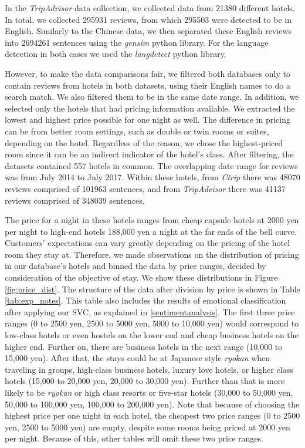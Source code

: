 \documentclass[smallextended,natbib]{svjour3}       %
\begin{document}
    In the \textit{TripAdvisor} data collection, we collected data from \num[group-separator={,}]{21380} different hotels. In total, we collected \num[group-separator={,}]{295931} reviews, from which \num[group-separator={,}]{295503} were detected to be in English. Similarly to the Chinese data, we then separated these English reviews into \num[group-separator={,}]{2694261} sentences using the \textit{gensim} python library. For the language detection in both cases we used the \textit{langdetect} python library.

    However, to make the data comparisons fair, we filtered both databases only to contain reviews from hotels in both datasets, using their English names to do a search match. We also filtered them to be in the same date range. In addition, we selected only the hotels that had pricing information available. We extracted the lowest and highest price possible for one night as well. The difference in pricing can be from better room settings, such as double or twin rooms or suites, depending on the hotel. Regardless of the reason, we chose the highest-priced room since it can be an indirect indicator of the hotel's class. After filtering, the datasets contained \num[group-separator={,}]{557} hotels in common. The overlapping date range for reviews was from July 2014 to July 2017. Within these hotels, from \textit{Ctrip} there was \num[group-separator={,}]{48070} reviews comprised of \num[group-separator={,}]{101963} sentences, and from \textit{TripAdvisor} there was \num[group-separator={,}]{41137} reviews comprised of \num[group-separator={,}]{348039} sentences. 

    The price for a night in these hotels ranges from cheap capsule hotels at 2000 yen per night to high-end hotels 188,000 yen a night at the far ends of the bell curve. Customers' expectations can vary greatly depending on the pricing of the hotel room they stay at. Therefore, we made observations on the distribution of pricing in our database's hotels and binned the data by price ranges, decided by consideration of the objective of stay. We show these distributions in Figure \ref{fig:price_dist}. The structure of the data after division by price is shown in Table \ref{tab:exp_notes}. This table also includes the results of emotional classification after applying our SVC, as explained in \ref{sentimentanalysis}. The first three price ranges (0 to 2500 yen, 2500 to 5000 yen, 5000 to 10,000 yen) would correspond to low-class hotels or even hostels on the lower end and cheap business hotels on the higher end. Further on, there are business hotels in the next range (10,000 to 15,000 yen). After that, the stays could be at Japanese style \textit{ryokan} when traveling in groups, high-class business hotels, luxury love hotels, or higher class hotels (15,000 to 20,000 yen, 20,000 to 30,000 yen). Further than that is more likely to be \textit{ryokan} or high class resorts or five-star hotels (30,000 to 50,000 yen, 50,000 to 100,000 yen, 100,000 to 200,000 yen). Note that because of choosing the highest price per one night in each hotel, the cheapest two price ranges (0 to 2500 yen, 2500 to 5000 yen) are empty, despite some rooms being priced at 2000 yen per night. Because of this, other tables will omit these two price ranges.
\end{document}
